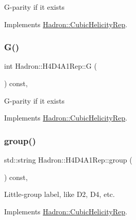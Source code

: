 G-\/parity if it exists 

Implements \mbox{\hyperlink{structHadron_1_1CubicHelicityRep_a50689f42be1e6170aa8cf6ad0597018b}{Hadron\+::\+Cubic\+Helicity\+Rep}}.

\mbox{\label{structHadron_1_1H4D4A1Rep_adfb4cdaba264ee24b4ab253ef4ca631c}} 
\subsubsection{\texorpdfstring{G()}{G()}\hspace{0.1cm}{\footnotesize\ttfamily [2/2]}}
{\footnotesize\ttfamily int Hadron\+::\+H4\+D4\+A1\+Rep\+::G (\begin{DoxyParamCaption}{ }\end{DoxyParamCaption}) const\hspace{0.3cm}{\ttfamily [inline]}, {\ttfamily [virtual]}}

G-\/parity if it exists 

Implements \mbox{\hyperlink{structHadron_1_1CubicHelicityRep_a50689f42be1e6170aa8cf6ad0597018b}{Hadron\+::\+Cubic\+Helicity\+Rep}}.

\mbox{\label{structHadron_1_1H4D4A1Rep_a3402ac90043c637d96eeafff046ba3ed}} 
\subsubsection{\texorpdfstring{group()}{group()}\hspace{0.1cm}{\footnotesize\ttfamily [1/3]}}
{\footnotesize\ttfamily std\+::string Hadron\+::\+H4\+D4\+A1\+Rep\+::group (\begin{DoxyParamCaption}{ }\end{DoxyParamCaption}) const\hspace{0.3cm}{\ttfamily [inline]}, {\ttfamily [virtual]}}

Little-\/group label, like D2, D4, etc. 

Implements \mbox{\hyperlink{structHadron_1_1CubicHelicityRep_a101a7d76cd8ccdad0f272db44b766113}{Hadron\+::\+Cubic\+Helicity\+Rep}}.

\mbox{\label{structHadron_1_1H4D4A1Rep_a3402ac90043c637d96eeafff046ba3ed}} 
